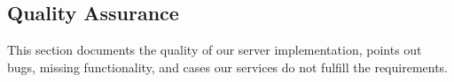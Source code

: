\subsection{Quality Assurance}
This section documents the quality of our server implementation, points out bugs, missing functionality, and cases our services do not fulfill the requirements. 



\newpage